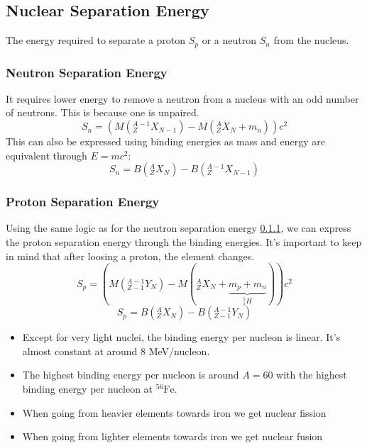 \subsection{Nuclear Separation Energy}
The energy required to separate a proton $S_{p}$ or a neutron $S_{n}$ from the nucleus.
\subsubsection{Neutron Separation Energy}\label{sssec: neutron_separation_energy}
It requires lower energy to remove a neutron from a nucleus with an odd number of neutrons. This is because one is unpaired. 
\begin{equation}
S_n = \left(M\left(_{Z}^{A-1}X_{N-1}\right) - M(_{Z}^{A}X_{N} + m_n)\right)c^2
\end{equation}
This can also be expressed using binding energies as mass and energy are equivalent through $E = mc^2$:
\begin{equation}
S_n = B\left(_{Z}^{A}X_{N}\right) - B\left(_{Z}^{A-1}X_{N-1}\right)
\end{equation}

\subsubsection{Proton Separation Energy}
Using the same logic as for the neutron separation energy \cref{sssec: neutron_separation_energy}, we can express the proton separation energy through the binding energies. It's important to keep in mind that after loosing a proton, the element changes.
\begin{equation}
S_p= \left(M\left(_{Z-1}^{A-1}Y_{N}\right) - M(_{Z}^{A}X_{N} + \underbrace{m_p + m_n}_{_{1}^{1}H_{}})\right)c^2
\end{equation}
\begin{equation}
S_p = B\left(_{Z}^{A}X_{N}\right) - B\left(_{Z-1}^{A-1}Y_{N}\right)
\end{equation}

\begin{itemize}
    \item Except for very light nuclei, the binding energy per nucleon is linear. It's almost constant at around 8 MeV/nucleon.
    \item The highest binding energy per nucleon is around $A = 60$ with the highest binding energy per nucleon at $^{56}\text{Fe}$. 
    \item When going from heavier elements towards iron we get nuclear fission
    \item When going from lighter elements towards iron we get nuclear fusion
\end{itemize}

